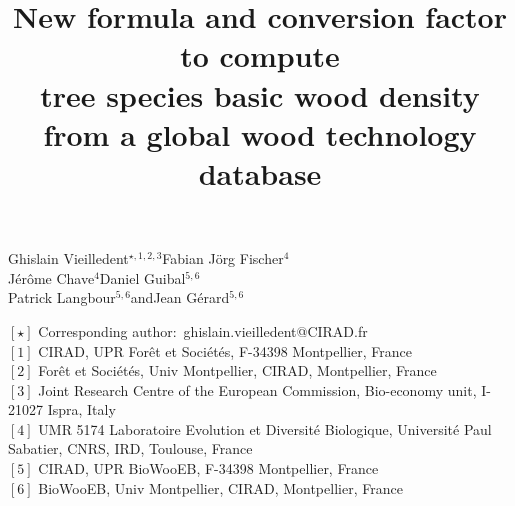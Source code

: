 \documentclass[a4paper, 12pt, leqno, dvipsnames]{article}\usepackage[]{graphicx}\usepackage[]{color}
\title{New formula and conversion factor to compute\\tree species basic wood density from a global wood technology database}
\author{}
\date{}
\begin{document}
\maketitle
\vspace{-1cm}
\begin{center}
  \large{Ghislain Vieilledent$^{\star,1,2,3}$\hspace{1cm}Fabian J\"org Fischer$^{4}$\\
  \vspace{0.15cm}
  Jérôme Chave$^{4}$\hspace{1cm}Daniel Guibal$^{5,6}$\\
  \vspace{0.15cm}
  Patrick Langbour$^{5,6}$\hspace{1cm}and\hspace{1cm}Jean Gérard$^{5,6}$}
\end{center}

\vspace{0.3cm}

% 

{\footnotesize
  \begin{flushleft}
    $[\star]$ Corresponding author:~ghislain.vieilledent@CIRAD.fr\\
    $[1]$ CIRAD, UPR Forêt et Sociétés, F-34398 Montpellier, France\\
    $[2]$ Forêt et Sociétés, Univ Montpellier, CIRAD, Montpellier, France\\
    $[3]$ Joint Research Centre of the European Commission, Bio-economy unit, I-21027 Ispra, Italy\\
    $[4]$ UMR 5174 Laboratoire Evolution et Diversité Biologique, Université Paul Sabatier, CNRS, IRD, Toulouse, France\\
    $[5]$ CIRAD, UPR BioWooEB, F-34398 Montpellier, France\\
    $[6]$ BioWooEB, Univ Montpellier, CIRAD, Montpellier, France\\
\end{flushleft}}
\end{document}
